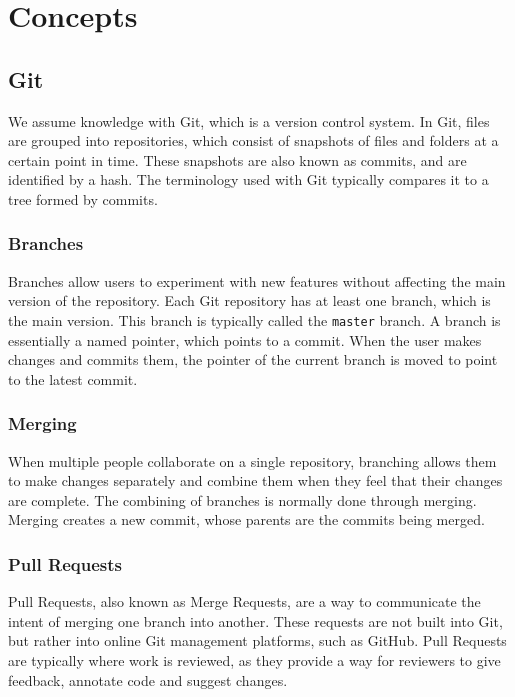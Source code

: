 \chapter*{Concepts}

\section*{Git}
We assume knowledge with Git\cite{git}, which is a version control system.
In Git, files are grouped into repositories, which consist of snapshots of files and folders at a certain point in time.
These snapshots are also known as commits, and are identified by a hash.
The terminology used with Git typically compares it to a tree formed by commits.

\subsection*{Branches}
Branches allow users to experiment with new features without affecting the main version of the repository.
Each Git repository has at least one branch, which is the main version.
This branch is typically called the \texttt{master} branch.
A branch is essentially a named pointer, which points to a commit.
When the user makes changes and commits them, the pointer of the current branch is moved to point to the latest commit.

\subsection*{Merging}
When multiple people collaborate on a single repository, branching allows them to make changes separately and combine them when they feel that their changes are complete.
The combining of branches is normally done through merging.
Merging creates a new commit, whose parents are the commits being merged.

\subsection*{Pull Requests}
Pull Requests, also known as Merge Requests, are a way to communicate the intent of merging one branch into another.
These requests are not built into Git, but rather into online Git management platforms, such as GitHub.
Pull Requests are typically where work is reviewed, as they provide a way for reviewers to give feedback, annotate code and suggest changes.


